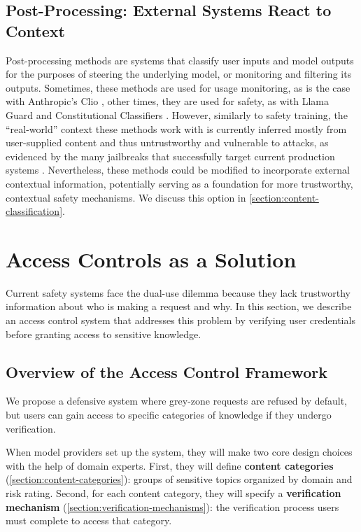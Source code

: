 \documentclass{article}
\theoremstyle{plain}
\theoremstyle{definition}
\theoremstyle{remark}
\begin{document}
\subsection{Post-Processing: External Systems React to Context} \label{section:post-processing}

Post-processing methods are systems that classify user inputs and model outputs for the purposes of steering the underlying model, or monitoring and filtering its outputs.
Sometimes, these methods are used for usage monitoring, as is the case with Anthropic's Clio \cite{tamkin2024clioprivacypreservinginsightsrealworld, handa2025economictasksperformedai}, other times, they are used for safety, as with Llama Guard \cite{inan2023llamaguardllmbasedinputoutput} and Constitutional Classifiers \cite{sharma2025constitutionalclassifiersdefendinguniversal}.
However, similarly to safety training, the ``real-world'' context these methods work with is currently inferred mostly from user-supplied content and thus untrustworthy and vulnerable to attacks, as evidenced by the many jailbreaks that successfully target current production systems \cite{zhang2025outputconstraintsattacksurface}.
Nevertheless, these methods could be modified to incorporate external contextual information, potentially serving as a foundation for more trustworthy, contextual safety mechanisms. We discuss this option in \cref{section:content-classification}.

\section{Access Controls as a Solution}
\label{section:access-controls}

Current safety systems face the dual-use dilemma because they lack trustworthy information about who is making a request and why.
In this section, we describe an access control system that addresses this problem by verifying user credentials before granting access to sensitive knowledge.

\subsection{Overview of the Access Control Framework} \label{section:access-control-overview}

We propose a defensive system where grey-zone requests are refused by default, but users can gain access to specific categories of knowledge if they undergo verification.

When model providers set up the system, they will make two core design choices with the help of domain experts.
First, they will define \textbf{content categories} (\cref{section:content-categories}): groups of sensitive topics organized by domain and risk rating.
Second, for each content category, they will specify a \textbf{verification mechanism} (\cref{section:verification-mechanisms}): the verification process users must complete to access that category.
\end{document}
